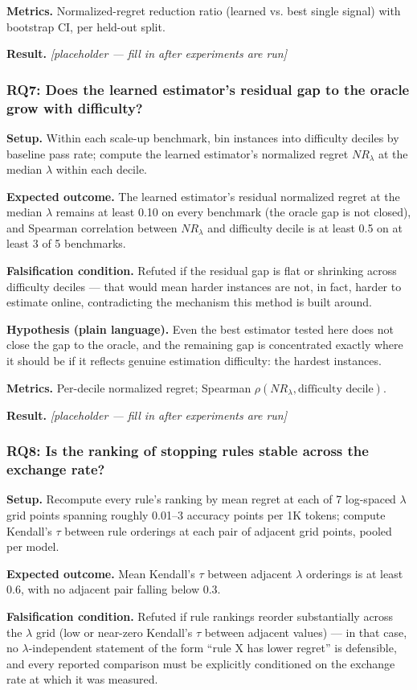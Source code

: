 \documentclass[11pt]{article}
\newcommand{\ph}{\textit{[placeholder --- fill in after experiments are run]}}
\begin{document}
\textbf{Metrics.} Normalized-regret reduction ratio (learned vs. best single signal) with bootstrap CI, per held-out split.

\textbf{Result.} \ph

\subsubsection{RQ7: Does the learned estimator's residual gap to the oracle grow with difficulty?}
\textbf{Setup.} Within each scale-up benchmark, bin instances into difficulty deciles by baseline pass rate; compute the learned estimator's normalized regret $NR_\lambda$ at the median $\lambda$ within each decile.

\textbf{Expected outcome.} The learned estimator's residual normalized regret at the median $\lambda$ remains at least 0.10 on every benchmark (the oracle gap is not closed), and Spearman correlation between $NR_\lambda$ and difficulty decile is at least 0.5 on at least 3 of 5 benchmarks.

\textbf{Falsification condition.} Refuted if the residual gap is flat or shrinking across difficulty deciles --- that would mean harder instances are not, in fact, harder to estimate online, contradicting the mechanism this method is built around.

\textbf{Hypothesis (plain language).} Even the best estimator tested here does not close the gap to the oracle, and the remaining gap is concentrated exactly where it should be if it reflects genuine estimation difficulty: the hardest instances.

\textbf{Metrics.} Per-decile normalized regret; Spearman $\rho(NR_\lambda, \text{difficulty decile})$.

\textbf{Result.} \ph

\subsubsection{RQ8: Is the ranking of stopping rules stable across the exchange rate?}
\textbf{Setup.} Recompute every rule's ranking by mean regret at each of 7 log-spaced $\lambda$ grid points spanning roughly 0.01--3 accuracy points per 1K tokens; compute Kendall's $\tau$ between rule orderings at each pair of adjacent grid points, pooled per model.

\textbf{Expected outcome.} Mean Kendall's $\tau$ between adjacent $\lambda$ orderings is at least 0.6, with no adjacent pair falling below 0.3.

\textbf{Falsification condition.} Refuted if rule rankings reorder substantially across the $\lambda$ grid (low or near-zero Kendall's $\tau$ between adjacent values) --- in that case, no $\lambda$-independent statement of the form ``rule X has lower regret'' is defensible, and every reported comparison must be explicitly conditioned on the exchange rate at which it was measured.
\end{document}

